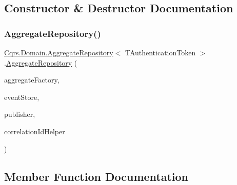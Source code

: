 \subsection{Constructor \& Destructor Documentation}
\mbox{\label{classCqrs_1_1Domain_1_1AggregateRepository_ae4a6c96b10c536a0df6a381659f87744_ae4a6c96b10c536a0df6a381659f87744}} 
\subsubsection{\texorpdfstring{Aggregate\+Repository()}{AggregateRepository()}}
{\footnotesize\ttfamily \hyperlink{classCqrs_1_1Domain_1_1AggregateRepository}{Cqrs.\+Domain.\+Aggregate\+Repository}$<$ T\+Authentication\+Token $>$.\hyperlink{classCqrs_1_1Domain_1_1AggregateRepository}{Aggregate\+Repository} (\begin{DoxyParamCaption}\item[{\hyperlink{interfaceCqrs_1_1Domain_1_1Factories_1_1IAggregateFactory}{I\+Aggregate\+Factory}}]{aggregate\+Factory,  }\item[{\hyperlink{interfaceCqrs_1_1Events_1_1IEventStore}{I\+Event\+Store}$<$ T\+Authentication\+Token $>$}]{event\+Store,  }\item[{\hyperlink{interfaceCqrs_1_1Events_1_1IEventPublisher}{I\+Event\+Publisher}$<$ T\+Authentication\+Token $>$}]{publisher,  }\item[{I\+Correlation\+Id\+Helper}]{correlation\+Id\+Helper }\end{DoxyParamCaption})}



\subsection{Member Function Documentation}
\mbox{\label{classCqrs_1_1Domain_1_1AggregateRepository_a64d82c57bbe49a11bd5cf20c5b86ce19_a64d82c57bbe49a11bd5cf20c5b86ce19}} 
